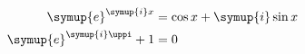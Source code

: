 \documentclass[varwidth, preview]{standalone}
\newcommand\upe{\symup{e}}
\newcommand\upi{\symup{i}}
\begin{document}
\begin{align*}
  \upe^{\upi x} &= \cos{x} + \upi \sin{x} \\
  \upe^{\upi \uppi} + 1 &= 0
\end{align*}
\end{document}
